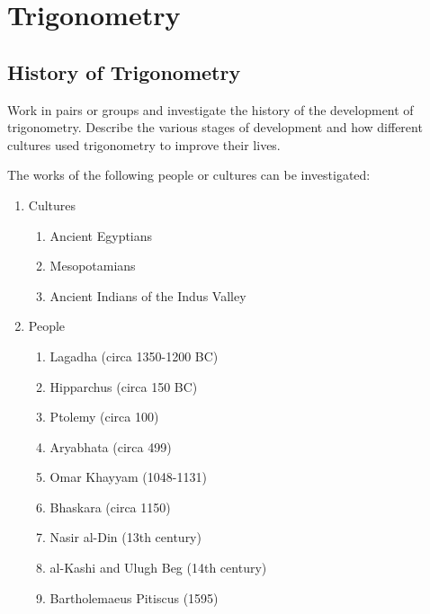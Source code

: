 \chapter{Trigonometry}
\label{m:t11}

\section{History of Trigonometry}
\label{mt:h}


Work in pairs or groups and investigate the history of the development of trigonometry. Describe the various stages of development and how different cultures used trigonometry to improve their lives.

The works of the following people or cultures can be investigated:
\begin{enumerate}
\item{Cultures}
\begin{enumerate}
\item{Ancient Egyptians}
\item{Mesopotamians}
\item{Ancient Indians of the Indus Valley}
\end{enumerate}
\item{People}
\begin{enumerate}
\item{Lagadha (circa 1350-1200 BC)}
\item{Hipparchus (circa 150 BC)}
\item{Ptolemy (circa 100)}
\item{Aryabhata (circa 499)}
\item{Omar Khayyam (1048-1131)}
\item{Bhaskara (circa 1150)}
\item{Nasir al-Din (13th century)}
\item{al-Kashi and Ulugh Beg (14th century)}\
\item{Bartholemaeus Pitiscus (1595)}
\end{enumerate}
\end{enumerate}

